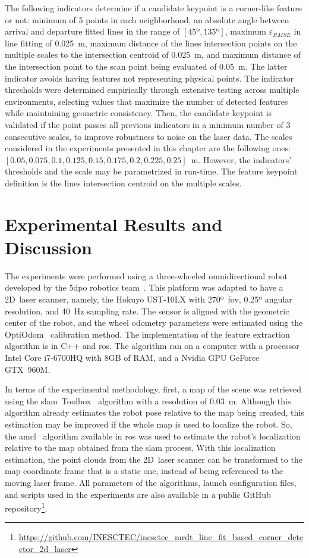 The following indicators determine if a candidate keypoint
is a corner-like feature or not:
minimum of 5 points in each neighborhood,
an absolute angle between arrival and departure fitted lines in the range of
$\left[45\text{º},135\text{º}\right]$,
maximum $\varepsilon_{RMSE}$ in line fitting of 0.025~m,
maximum distance of the lines intersection points on the multiple scales to
the intersection centroid of 0.025~m,
and maximum distance of the intersection point to the scan point
being evaluated of 0.05~m.
The latter indicator avoids having features not representing physical points.
The indicator thresholds were determined empirically through extensive
testing across multiple environments, selecting values that maximize
the number of detected features while maintaining geometric consistency.
Then, the candidate keypoint is validated if the point passes
all previous indicators in a minimum number of 3 consecutive scales,
to improve robustness to noise on the laser data. The scales considered in the
experiments presented in this chapter are the following ones:
$\left[0.05, 0.075, 0.1, 0.125, 0.15, 0.175, 0.2, 0.225, 0.25\right]$~m.
However, the indicators' thresholds and the scale may be parametrized in
run-time. The feature keypoint definition is
the lines intersection centroid on the multiple scales.

\section{Experimental Results and Discussion}\label{sec:features:results}

The experiments were performed using a three-wheeled omnidirectional robot
developed by the 5dpo robotics team~\cite{5dpo}.
This platform was adapted to have a 2D~laser scanner, namely,
the Hokuyo UST-10LX with 270º~\gls{fov}, 0.25º angular resolution,
and 40~Hz sampling rate.
The sensor is aligned with the geometric center of the robot,
and the wheel odometry parameters were estimated using the
OptiOdom~\cite{sousa:jint:2022} calibration method.
The implementation of the feature extraction algorithm is in C++ and \gls{ros}.
The algorithm ran on a computer with a processor Intel Core i7-6700HQ
with 8GB of RAM, and a Nvidia GPU GeForce GTX~960M.

In terms of the experimental methodology, first, a map of the scene
was retrieved using the \gls{slam}~Toolbox~\cite{macenski-jambrecic:joss:2021}
algorithm with a resolution of 0.03~m.
Although this algorithm already estimates the robot pose relative to the map
being created, this estimation may be improved
if the whole map is used to localize the robot.
So, the \gls{amcl}~\cite{thrun:book:2005} algorithm available in \gls{ros}
was used to estimate the robot's localization relative to the map obtained
from the \gls{slam} process.
With this localization estimation, the point clouds from the 2D~laser scanner
can be transformed to the map coordinate frame that is a static one,
instead of being referenced to the moving laser frame.
All parameters of the algorithms, launch configuration files,
and scripts used in the experiments are also available in a public GitHub
repository\footnote{\url{https://github.com/INESCTEC/inesctec_mrdt_line_fit_based_corner_detector_2d_laser}}.

